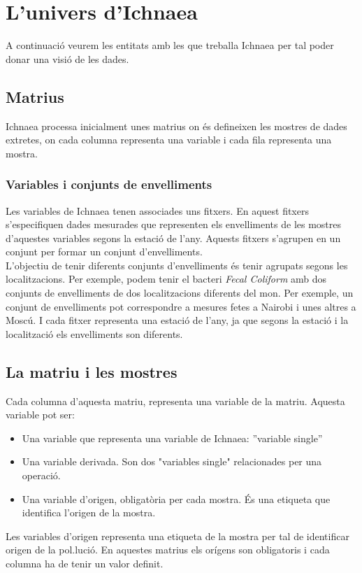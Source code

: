 \section{L'univers d'Ichnaea}
A continuaci\'{o} veurem les entitats amb les que treballa Ichnaea per tal poder donar una visi\'{o} de les dades.

\subsection{Matrius}
\label{cha:backgroud:univers:matrius}
Ichnaea processa inicialment unes matrius on \'e{s} defineixen les mostres de dades extretes, on cada columna representa una variable i cada fila representa una mostra. 

\subsubsection{Variables i conjunts de envelliments}
\label{cha:backgroud:univers:matrius:variables_seasons}
Les variables de Ichnaea tenen associades uns fitxers. En aquest fitxers s'especifiquen dades mesurades que representen els envelliments de les mostres d'aquestes variables segons la estació de l'any. Aquests fitxers s'agrupen en un conjunt per formar un conjunt d'envelliments.\\

L'objectiu de tenir diferents conjunts d'envelliments \'{e}s tenir agrupats segons les localitzacions. Per exemple, podem tenir el bacteri \textit{Fecal Coliform} amb dos conjunts de envelliments de dos localitzacions diferents del mon. Per exemple, un conjunt de envelliments pot correspondre a mesures fetes a Nairobi i unes altres a Mosc\'{u}. I cada fitxer representa una estaci\'{o} de l'any, ja que segons la estaci\'{o} i la localitzaci\'{o} els envelliments son diferents.\\

\subsection{La matriu i les mostres}
Cada columna d'aquesta matriu, representa una variable de la matriu. Aquesta variable pot ser:\\
\begin{itemize}
\item Una variable que representa una variable de Ichnaea: ''variable single''
\item Una variable derivada. Son dos "variables single" relacionades per una operaci\'{o}.
\item Una variable d'origen, obligatòria per cada mostra. \'{E}s una etiqueta que identifica l'origen de la mostra.
\end{itemize}
Les variables d'origen representa una etiqueta de la mostra per tal de identificar origen de la pol.luci\'{o}. En aquestes matrius els orígens son obligatoris i cada columna ha de tenir un valor definit.\\

